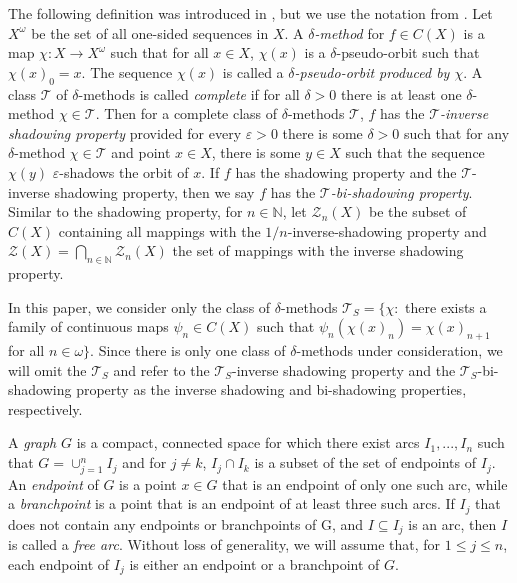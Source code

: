 \documentclass{amsart}
\numberwithin{equation}{section}
\begin{document}
The following definition was introduced in \cite{weakshadowignintroduced}, but we use the notation from \cite{Inverseshadowinggenericvarious}. Let $X^\omega$ be the set of all one-sided sequences in $X$. A \emph{$\delta$-method} for $f\in C(X)$ is a map $\chi :X\to X^\omega$ such that for all $x\in X$, $\chi(x)$ is a $\delta$-pseudo-orbit such that $\chi(x)_0=x$. The sequence $\chi(x)$ is called a \emph{$\delta$-pseudo-orbit produced by $\chi$}. A class $\mathcal{T}$ of $\delta$-methods is called \emph{complete} if for all $\delta>0$ there is at least one $\delta$-method $\chi\in\mathcal{T}$. Then for a complete class of $\delta$-methods $\mathcal{T}$, $f$ has the \emph{$\mathcal T$-inverse shadowing property} provided for every $\varepsilon>0$ there is some $\delta>0$ such that for any $\delta$-method $\chi\in \mathcal{T}$ and point $x\in X$, there is some $y\in X$ such that the sequence $\chi(y)$ $\varepsilon$-shadows the orbit of $x$. 
If $f$ has the shadowing property and the $\mathcal{T}$-inverse shadowing property, then we say $f$ has the \emph{$\mathcal{T}$-bi-shadowing property}.  Similar to the shadowing property, for $n\in \mathbb N$, let $\mathcal{Z}_n(X)$ be the subset of $C(X)$ containing all mappings with the $1/n$-inverse-shadowing property and $\mathcal{Z}(X)=\bigcap_{n\in \mathbb N}\mathcal{Z}_n(X) $  the set of mappings with the inverse shadowing property. 

In this paper, we consider only the class of $\delta$-methods $\mathcal{T}_S=\{\chi:$ there exists a family of continuous maps $\psi_n\in C(X)$ such that $\psi_n(\chi(x)_n)=\chi(x)_{n+1}$ for all $n\in \omega\}.$ Since there is only one class of $\delta$-methods under consideration, we will omit the $\mathcal T_S$ and refer to the $\mathcal T_S$-inverse shadowing property and the $\mathcal T_S$-bi-shadowing property as the inverse shadowing and bi-shadowing properties, respectively.





A \emph{graph} $G$ is a compact, connected space for which there exist arcs $I_1,...,I_n$ such that $G=\displaystyle\cup_{j=1}^nI_j$ and for $j\neq k$, $I_j\cap I_k$ is a subset of the set of endpoints of $I_j$. An \emph{endpoint} of $G$ is a point $x\in G$ that is an endpoint of only one such arc, while a \emph{branchpoint} is a point that is an endpoint of at least three such arcs.  If $I_j$ that does not contain any endpoints or branchpoints of G, and $I\subseteq I_j$ is an arc, then $I$ is called a \emph{free arc}. Without loss of generality, we will assume that, for $1\leq j\leq n$, each endpoint of $I_j$ is either an endpoint or a branchpoint of $G$. 
\end{document}
